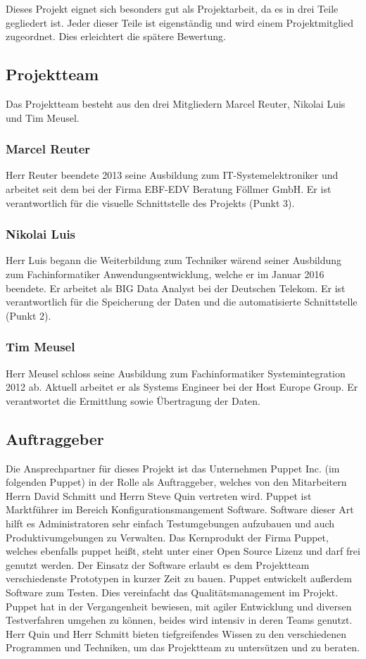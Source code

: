 Dieses Projekt eignet sich besonders gut als Projektarbeit, da es in drei Teile
gegliedert ist. Jeder dieser Teile ist eigenständig und wird einem
Projektmitglied zugeordnet. Dies erleichtert die spätere Bewertung.
\tm%

\subsection{Projektteam}
Das Projektteam besteht aus den drei Mitgliedern Marcel Reuter, Nikolai Luis
und Tim Meusel.
\tm%

\subsubsection{Marcel Reuter}
Herr Reuter beendete 2013 seine Ausbildung zum IT-Systemelektroniker und
arbeitet seit dem bei der Firma EBF-EDV Beratung Föllmer GmbH. Er ist
verantwortlich für die visuelle Schnittstelle des Projekts (Punkt 3).
\mr%

\subsubsection{Nikolai Luis}
Herr Luis begann die Weiterbildung zum Techniker wärend seiner Ausbildung zum
Fachinformatiker Anwendungsentwicklung, welche er im Januar 2016 beendete. Er
arbeitet als BIG Data Analyst bei der Deutschen Telekom. Er ist verantwortlich
für die Speicherung der Daten und die automatisierte Schnittstelle (Punkt 2).
\nl%

\subsubsection{Tim Meusel}
Herr Meusel schloss seine Ausbildung zum Fachinformatiker Systemintegration
2012 ab. Aktuell arbeitet er als Systems Engineer bei der Host Europe Group.
Er verantwortet die Ermittlung sowie Übertragung der Daten.
\tm%

\subsection{Auftraggeber}
Die Ansprechpartner für dieses Projekt ist das Unternehmen Puppet Inc. (im
folgenden Puppet) in der Rolle als Auftraggeber, welches von den Mitarbeitern
Herrn David Schmitt und Herrn Steve Quin vertreten wird. Puppet ist Marktführer
im Bereich Konfigurationsmangement Software. Software dieser Art hilft es
Administratoren sehr einfach Testumgebungen aufzubauen und auch
Produktivumgebungen zu Verwalten. Das Kernprodukt der Firma Puppet, welches
ebenfalls puppet heißt, steht unter einer Open Source Lizenz und darf frei
genutzt werden. Der Einsatz der Software erlaubt es dem Projektteam
verschiedenste Prototypen in kurzer Zeit zu bauen. Puppet entwickelt außerdem
Software zum Testen. Dies vereinfacht das Qualitätsmanagement im Projekt.
Puppet hat in der Vergangenheit bewiesen, mit agiler Entwicklung und diversen
Testverfahren umgehen zu können, beides wird intensiv in deren Teams genutzt.
Herr Quin und Herr Schmitt bieten tiefgreifendes Wissen zu den verschiedenen
Programmen und Techniken, um das Projektteam zu untersützen und zu beraten.
\tm%

